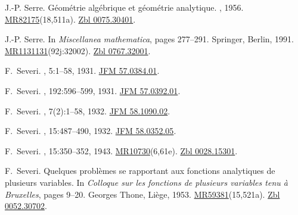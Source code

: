 \documentclass[11pt,a4paper, final, twoside]{article}
\numberwithin{equation}{section}
\begin{document}
\begin{appendices}
\begin{thebibliography}{100}
J.-P. Serre.
\newblock G\'eom\'etrie alg\'ebrique et g\'eom\'etrie analytique.
, 1956.
\newblock
  \href{http://www.ams.org/mathscinet-getitem?mr=82175}{MR82175}(18,511a).
  \href{http://zbmath.org/?q=an:0075.30401}{Zbl 0075.30401}.

J.-P. Serre.
\newblock In {\em {Miscellanea mathematica}}, pages 277--291. Springer, Berlin,
  1991.
\newblock
  \href{http://www.ams.org/mathscinet-getitem?mr=1131131}{MR1131131}(92j:32002).
  \href{http://zbmath.org/?q=an:0767.32001}{Zbl 0767.32001}.

F.~Severi.
,
  5:1--58, 1931.
\newblock \href{http://zbmath.org/?q=an:57.0384.01}{JFM 57.0384.01}.

F.~Severi.
, 192:596--599, 1931.
\newblock \href{http://zbmath.org/?q=an:57.0392.01}{JFM 57.0392.01}.

F.~Severi.
, 7(2):1--58, 1932.
\newblock \href{http://zbmath.org/?q=an:58.1090.02}{JFM 58.1090.02}.

F.~Severi.
, 15:487--490, 1932.
\newblock \href{http://zbmath.org/?q=an:58.0352.05}{JFM 58.0352.05}.

F.~Severi.
, 15:350--352, 1943.
\newblock
  \href{http://www.ams.org/mathscinet-getitem?mr=10730}{MR10730}(6,61e).
  \href{http://zbmath.org/?q=an:0028.15301}{Zbl 0028.15301}.

F.~Severi.
\newblock Quelques probl\`emes se rapportant aux fonctions analytiques de
  plusieurs variables.
\newblock In {\em Colloque sur les fonctions de plusieurs variables tenu \`a
  {B}ruxelles}, pages 9--20. Georges Thone, Li\`ege, 1953.
\newblock
  \href{http://www.ams.org/mathscinet-getitem?mr=59381}{MR59381}(15,521a).
  \href{http://zbmath.org/?q=an:0052.30702}{Zbl 0052.30702}.


\end{thebibliography}
\end{appendices}
\end{document}
